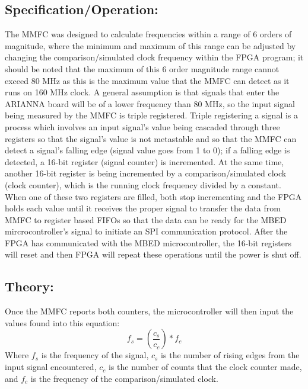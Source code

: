\documentclass[journal]{IEEEtran}
\begin{document}
\subsection{Specification/Operation:}
The MMFC was designed to calculate frequencies within a range of 6 orders of magnitude, where the minimum and maximum of this range can be adjusted by changing the comparison/simulated clock frequency within the FPGA program; it should be noted that the maximum of this 6 order magnitude range cannot exceed 80 MHz as this is the maximum value that the MMFC can detect as it runs on 160 MHz clock.  A general assumption is that signals that enter the ARIANNA board will be of a lower frequency than 80 MHz, so the input signal being measured by the MMFC is triple registered.  Triple registering a signal is a process which involves an input signal's value being cascaded through three registers so that the signal's value is not metastable and so that the MMFC can detect a signal's falling edge (signal value goes from 1 to 0); if a falling edge is detected, a 16-bit register (signal counter) is incremented.  At the same time, another 16-bit register is being incremented by a comparison/simulated clock (clock counter), which is the running clock frequency divided by a constant.  When one of these two registers are filled, both stop incrementing and the FPGA holds each value until it receives the proper signal to transfer the data from MMFC to register based FIFOs so that the data can be ready for the MBED mircrocontroller's signal to initiate an SPI communication protocol.  After the FPGA has communicated with the MBED microcontroller, the 16-bit registers will reset and then FPGA will repeat these operations until the power is shut off.  
\subsection{Theory:}
Once the MMFC reports both counters, the microcontroller will then input the values found into this equation: 
\begin{equation*}
f_s = \left(\frac{c_s}{c_c}\right)*f_c
\end{equation*}
Where $f_s$ is the frequency of the signal, $c_s$ is the number of rising edges from the input signal encountered, $c_c$ is the number of counts that the clock counter made, and $f_c$ is the frequency of the comparison/simulated clock. 
\end{document}

